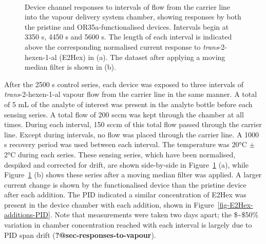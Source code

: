 \documentclass[
  a4paper,
]{scrbook}
\begin{document}
\begin{figure}
\begin{minipage}[t]{0.70\linewidth}
{{}

}

\end{minipage}%
%
\begin{minipage}[t]{0.15\linewidth}

{\centering 

~

}

\end{minipage}%

\caption{\label{fig-E2Hex-sampling}Device channel responses to intervals
of flow from the carrier line into the vapour delivery system chamber,
showing responses by both the pristine and OR35a-functionalised devices.
Intervals begin at 3350 s, 4450 s and 5600 s. The length of each
interval is indicated above the corresponding normalised current
response to \emph{trans}-2-hexen-1-al (E2Hex) in (a). The dataset after
applying a moving median filter is shown in (b).}

\end{figure}

After the 2500 s control series, each device was exposed to three
intervals of \emph{trans}-2-hexen-1-al vapour flow from the carrier line
in the same manner. A total of 5 mL of the analyte of interest was
present in the analyte bottle before each sensing series. A total flow
of 200 sccm was kept through the chamber at all times. During each
interval, 150 sccm of this total flow passed through the carrier line.
Except during intervals, no flow was placed through the carrier line. A
1000 s recovery period was used between each interval. The temperature
was 20°C \(\pm\) 2°C during each series. These sensing series, which
have been normalised, despiked and corrected for drift, are shown
side-by-side in Figure~\ref{fig-E2Hex-sampling} (a), while
Figure~\ref{fig-E2Hex-sampling} (b) shows these series after a moving
median filter was applied. A larger current change is shown by the
functionalised device than the pristine device after each addition. The
PID indicated a similar concentration of E2Hex was present in the device
chamber with each addition, shown in
Figure~\ref{fig-E2Hex-additions-PID}. Note that measurements were taken
two days apart; the \$\sim\$50\% variation in chamber concentration
reached with each interval is largely due to PID span drift
(\textbf{?@sec-responses-to-vapour}).
\end{document}
